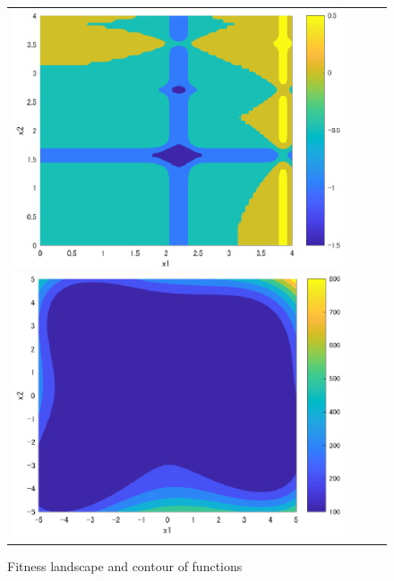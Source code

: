 \documentclass{jarticle}
\begin{document}
\begin{figure}[h]
\begin{tabular}{cccc}
\begin{minipage}{0.24\hsize}
\centering
\includegraphics[width=1.0\linewidth]{eps/cont_michalewicz.eps}
\caption{}
\label{fig:cont_michalewicz}
\end{minipage} 

\begin{minipage}{0.24\hsize}
\centering
\includegraphics[width=1.0\linewidth]{eps/cont_himmelblau.eps}
\caption{}
\label{fig:cont_himmelblau}
\end{minipage} 

\end{tabular}
\setcounter{figure}{1}
\caption{Fitness landscape and contour of functions}
\label{fig:all_func}

\end{figure}
\end{document}
